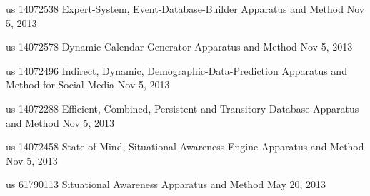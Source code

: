 
\begin{cvhonors}

  \cvhonor
    {us 14072538} %
    {Expert-System, Event-Database-Builder Apparatus and Method} %
    {Nov 5, 2013} %
    {} %

  \cvhonor
    {us 14072578} %
    {Dynamic Calendar Generator Apparatus and Method} %
    {Nov 5, 2013} %
    {} %

  \cvhonor
    {us 14072496} %
    {Indirect, Dynamic, Demographic-Data-Prediction Apparatus and Method for Social Media} %
    {Nov 5, 2013} %
    {} %

  \cvhonor
    {us 14072288} %
    {Efficient, Combined, Persistent-and-Transitory Database Apparatus and Method} %
    {Nov 5, 2013} %
    {} %

  \cvhonor
    {us 14072458} %
    {State-of Mind, Situational Awareness Engine Apparatus and Method} %
    {Nov 5, 2013} %
    {} %

  \cvhonor
    {us 61790113} %
    {Situational Awareness Apparatus and Method} %
    {May 20, 2013} %
    {} %
\end{cvhonors}
